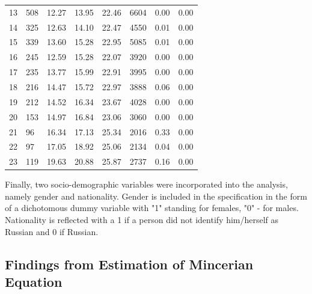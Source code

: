 \documentclass[12pt,a4paper]{article}
\begin{document}
\begin{table}[H]
\begin{tabular}{p{3cm}p{1.5cm}p{1.5cm}p{1.5cm}p{1.5cm}rp{1cm}p{1cm}}
   13 & 508 & 12.27 & 13.95 & 22.46 & 6604 & 0.00 & 0.00 \\ 
   14 & 325 & 12.63 & 14.10 & 22.47 & 4550 & 0.01 & 0.00 \\ 
   15 & 339 & 13.60 & 15.28 & 22.95 & 5085 & 0.01 & 0.00 \\ 
   16 & 245 & 12.59 & 15.28 & 22.07 & 3920 & 0.00 & 0.00 \\ 
   17 & 235 & 13.77 & 15.99 & 22.91 & 3995 & 0.00 & 0.00 \\ 
   18 & 216 & 14.47 & 15.72 & 22.97 & 3888 & 0.06 & 0.00 \\ 
   19 & 212 & 14.52 & 16.34 & 23.67 & 4028 & 0.00 & 0.00 \\ 
   20 & 153 & 14.97 & 16.84 & 23.06 & 3060 & 0.00 & 0.00 \\ 
   21 &  96 & 16.34 & 17.13 & 25.34 & 2016 & 0.33 & 0.00 \\ 
   22 &  97 & 17.05 & 18.92 & 25.06 & 2134 & 0.04 & 0.00 \\ 
   23 & 119 & 19.63 & 20.88 & 25.87 & 2737 & 0.16 & 0.00 \\ 
   \hline
\end{tabular}
\end{table}


Finally, two socio-demographic variables were incorporated into the analysis, namely gender and nationality. Gender is included in the specification in the form of a dichotomous dummy variable with "1" standing for females, "0" - for males. Nationality is reflected with a 1 if a person did not identify him/herself as Russian and 0 if Russian.

\subsection*{Findings from Estimation of Mincerian Equation}
\end{document}

